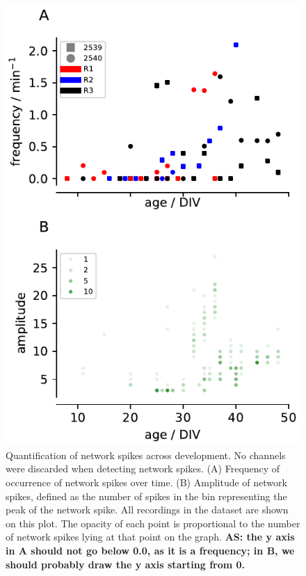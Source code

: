 \documentclass[doublespacing]{bmcart}
\begin{document}
\begin{backmatter}
\begin{figure}[h!]
    \includegraphics{../plots/network_spikes_scatter.pdf}
	\caption{Quantification of network spikes across development. No channels were discarded when detecting network spikes. (A) Frequency of occurrence of network spikes over time. (B) Amplitude of network spikes, defined as the number of spikes in the bin representing the peak of the network spike. All recordings in the dataset are shown on this plot. The opacity of each point is proportional to the number of network spikes lying at that point on the graph.  \textbf{AS: the y axis in A should not go below 0.0, as it is a frequency; in B, we should probably draw the y axis starting from 0.}}
	\label{fig:networkfreq}
\end{figure}

\end{backmatter}
\end{document}
